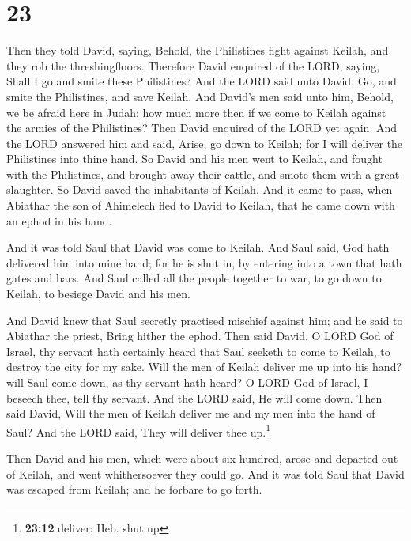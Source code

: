 \hypertarget{section-22}{%
\section{23}\label{section-22}}

 Then they told David, saying, Behold, the Philistines
fight against Keilah, and they rob the threshingfloors. 
Therefore David enquired of the LORD, saying, Shall I go and smite these
Philistines? And the LORD said unto David, Go, and smite the
Philistines, and save Keilah.  And David's men said unto
him, Behold, we be afraid here in Judah: how much more then if we come
to Keilah against the armies of the Philistines?  Then
David enquired of the LORD yet again. And the LORD answered him and
said, Arise, go down to Keilah; for I will deliver the Philistines into
thine hand.  So David and his men went to Keilah, and
fought with the Philistines, and brought away their cattle, and smote
them with a great slaughter. So David saved the inhabitants of Keilah.
 And it came to pass, when Abiathar the son of Ahimelech
fled to David to Keilah, that he came down with an ephod in his hand.

 And it was told Saul that David was come to Keilah. And
Saul said, God hath delivered him into mine hand; for he is shut in, by
entering into a town that hath gates and bars.  And Saul
called all the people together to war, to go down to Keilah, to besiege
David and his men.

 And David knew that Saul secretly practised mischief
against him; and he said to Abiathar the priest, Bring hither the ephod.
 Then said David, O LORD God of Israel, thy servant hath
certainly heard that Saul seeketh to come to Keilah, to destroy the city
for my sake.  Will the men of Keilah deliver me up into
his hand? will Saul come down, as thy servant hath heard? O LORD God of
Israel, I beseech thee, tell thy servant. And the LORD said, He will
come down.  Then said David, Will the men of Keilah
deliver me and my men into the hand of Saul? And the LORD said, They
will deliver thee up.\footnote{\textbf{23:12} deliver: Heb. shut up}

 Then David and his men, which were about six hundred,
arose and departed out of Keilah, and went whithersoever they could go.
And it was told Saul that David was escaped from Keilah; and he forbare
to go forth.


